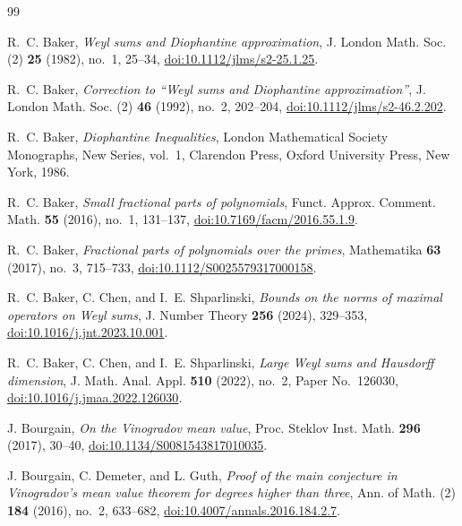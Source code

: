 \documentclass[11pt,reqno]{amsart}
\numberwithin{equation}{section}
\theoremstyle{definition}
\theoremstyle{remark}
\begin{document}
\begin{thebibliography}{99}

R.~C. Baker,
\emph{Weyl sums and Diophantine approximation},
J. London Math. Soc. (2) \textbf{25} (1982), no.~1, 25--34,
\href{https://doi.org/10.1112/jlms/s2-25.1.25}{doi:10.1112/jlms/s2-25.1.25}.

R.~C. Baker,
\emph{Correction to ``Weyl sums and Diophantine approximation''},
J. London Math. Soc. (2) \textbf{46} (1992), no.~2, 202--204,
\href{https://doi.org/10.1112/jlms/s2-46.2.202}{doi:10.1112/jlms/s2-46.2.202}.

R.~C. Baker,
\emph{Diophantine Inequalities},
London Mathematical Society Monographs, New Series, vol.~1,
Clarendon Press, Oxford University Press, New York, 1986.

R.~C. Baker,
\emph{Small fractional parts of polynomials},
Funct. Approx. Comment. Math. \textbf{55} (2016), no.~1, 131--137,
\href{https://doi.org/10.7169/facm/2016.55.1.9}{doi:10.7169/facm/2016.55.1.9}.

R.~C. Baker,
\emph{Fractional parts of polynomials over the primes},
Mathematika \textbf{63} (2017), no.~3, 715--733,
\href{https://doi.org/10.1112/S0025579317000158}{doi:10.1112/S0025579317000158}.

R.~C. Baker, C. Chen, and I.~E. Shparlinski,
\emph{Bounds on the norms of maximal operators on Weyl sums},
J. Number Theory \textbf{256} (2024), 329--353,
\href{https://doi.org/10.1016/j.jnt.2023.10.001}{doi:10.1016/j.jnt.2023.10.001}.

R.~C. Baker, C. Chen, and I.~E. Shparlinski,
\emph{Large Weyl sums and Hausdorff dimension},
J. Math. Anal. Appl. \textbf{510} (2022), no.~2, Paper No.~126030,
\href{https://doi.org/10.1016/j.jmaa.2022.126030}{doi:10.1016/j.jmaa.2022.126030}.

J. Bourgain,
\emph{On the Vinogradov mean value},
Proc. Steklov Inst. Math. \textbf{296} (2017), 30--40,
\href{https://doi.org/10.1134/S0081543817010035}{doi:10.1134/S0081543817010035}.

J. Bourgain, C. Demeter, and L. Guth,
\emph{Proof of the main conjecture in Vinogradov's mean value theorem for degrees higher than three},
Ann. of Math. (2) \textbf{184} (2016), no.~2, 633--682,
\href{https://doi.org/10.4007/annals.2016.184.2.7}{doi:10.4007/annals.2016.184.2.7}.


\end{thebibliography}
\end{document}
